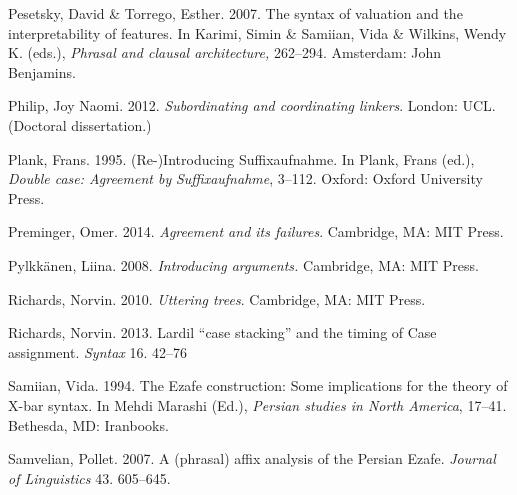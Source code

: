 \documentclass[output=paper]{langsci/langscibook}
\begin{document}
\begin{styleSfondomedioiColorexi}
Pesetsky, David \& Torrego, Esther. 2007. The syntax of valuation and the interpretability of features. In Karimi, Simin \& Samiian, Vida \& Wilkins, Wendy K. (eds.), \textit{Phrasal and clausal architecture,} 262–294. Amsterdam: John Benjamins.
\end{styleSfondomedioiColorexi}

\begin{styleSfondomedioiColorexi}
Philip, Joy Naomi. 2012. \textit{Subordinating and coordinating linkers}. London: UCL. (Doctoral dissertation.)
\end{styleSfondomedioiColorexi}

\begin{styleSfondomedioiColorexi}
Plank, Frans. 1995. (Re-)Introducing Suffixaufnahme. In Plank, Frans (ed.), \textit{Double case: Agreement by} \textit{Suffixaufnahme}, 3–112. Oxford: Oxford University Press.
\end{styleSfondomedioiColorexi}

\begin{styleSfondomedioiColorexi}
Preminger, Omer. 2014. \textit{Agreement and its failures}. Cambridge, MA: MIT Press.
\end{styleSfondomedioiColorexi}

\begin{styleSfondomedioiColorexi}
Pylkkänen, Liina. 2008. \textit{Introducing arguments.} Cambridge, MA: MIT Press.
\end{styleSfondomedioiColorexi}

\begin{styleSfondomedioiColorexi}
Richards, Norvin. 2010. \textit{Uttering trees}. Cambridge, MA: MIT Press.
\end{styleSfondomedioiColorexi}

\begin{styleSfondomedioiColorexi}
Richards, Norvin. 2013.  Lardil “case stacking” and the timing of Case assignment. \textit{Syntax} 16. 42–76
\end{styleSfondomedioiColorexi}

\begin{styleSfondomedioiColorexi}
Samiian, Vida. 1994. The Ezafe construction: Some implications for the theory of X-bar syntax. In Mehdi Marashi (Ed.), \textit{Persian studies in North America}, 17–41. Bethesda, MD: Iranbooks. 
\end{styleSfondomedioiColorexi}

\begin{styleSfondomedioiColorexxi}
Samvelian, Pollet. 2007. A (phrasal) affix analysis of the Persian Ezafe. \textit{Journal of Linguistics} 43. 605–645.
\end{styleSfondomedioiColorexxi}
\end{document}
